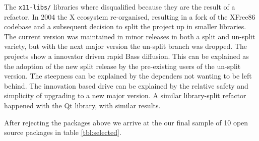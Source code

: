 \documentclass[smallextended,final]{svjour3}
\begin{document}
The \texttt{x11-libs/} libraries where disqualified because they are the result of a refactor. In 2004 the X ecosystem re-organised, resulting in a fork of the XFree86 codebase and a subsequent decision to split the project up in smaller libraries. The current version was maintained in minor releases in both a split and un-split variety, but with the next major version the un-split branch was dropped. The projects show a innovator driven rapid Bass diffusion. This can be explained as the adoption of the new split release by the pre-existing users of the un-split version. The steepness can be explained by the dependers not wanting to be left behind. The innovation based drive can be explained by the relative safety and simplicity of upgrading to a new major version. A similar library-split refactor happened with the Qt library, with similar results.

After rejecting the packages above we arrive at the our final sample of 10 open source packages in table \ref{tbl:selected}.
\end{document}
